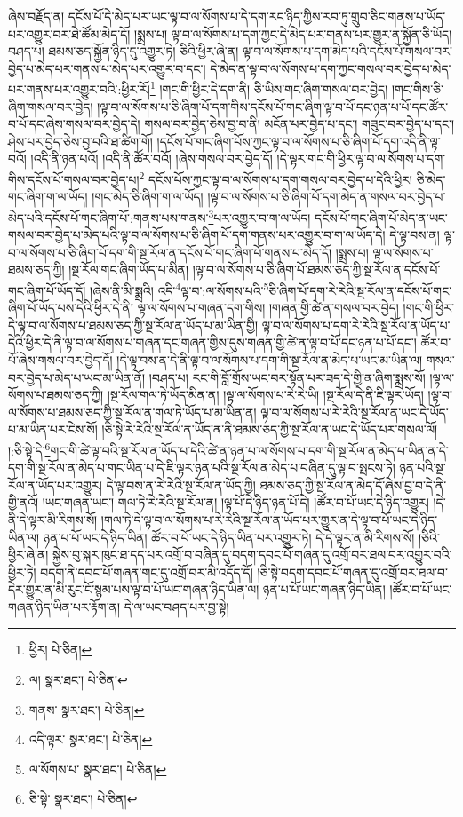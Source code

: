 ཞེས་བརྗོད་ན། དངོས་པོ་དེ་མེད་པར་ཡང་ལྟ་བ་ལ་སོགས་པ་དེ་དག་རང་ཉིད་ཀྱིས་རབ་ཏུ་གྲུབ་ཅིང་གནས་པ་ཡོད་པར་འགྱུར་བར་ཐེ་ཚོམ་མེད་དོ། །སྨྲས་པ། ལྟ་བ་ལ་སོགས་པ་དག་ཀྱང་དེ་མེད་པར་གནས་པར་གྱུར་ན་སྐྱོན་ཅི་ཡོད། བཤད་པ། ཐམས་ཅད་སྐྱོན་ཉིད་དུ་འགྱུར་ཏེ། ཅིའི་ཕྱིར་ཞེ་ན། ལྟ་བ་ལ་སོགས་པ་དག་མེད་པའི་དངོས་པོ་གསལ་བར་བྱེད་པ་མེད་པར་གནས་པ་མེད་པར་འགྱུར་བ་དང་། དེ་མེད་ན་ལྟ་བ་ལ་སོགས་པ་དག་ཀྱང་གསལ་བར་བྱེད་པ་མེད་པར་གནས་པར་འགྱུར་བའི་:ཕྱིར་རོ།\footnote{ཕྱིར།  པེ་ཅིན། } །གང་གི་ཕྱིར་དེ་དག་ནི། ཅི་ཡིས་གང་ཞིག་གསལ་བར་བྱེད། །གང་གིས་ཅི་ཞིག་གསལ་བར་བྱེད། །ལྟ་བ་ལ་སོགས་པ་ཅི་ཞིག་པོ་དག་གིས་དངོས་པོ་གང་ཞིག་ལྟ་བ་པོ་དང་ཉན་པ་པོ་དང་ཚོར་བ་པོ་དང་ཞེས་གསལ་བར་བྱེད་དེ། གསལ་བར་བྱེད་ཅེས་བྱ་བ་ནི། མངོན་པར་བྱེད་པ་དང་། གཟུང་བར་བྱེད་པ་དང་། ཤེས་པར་བྱེད་ཅེས་བྱ་བའི་ཐ་ཚིག་གོ། །དངོས་པོ་གང་ཞིག་པོས་ཀྱང་ལྟ་བ་ལ་སོགས་པ་ཅི་ཞིག་པོ་དག་འདི་ནི་ལྟ་བའོ། །འདི་ནི་ཉན་པའོ། །འདི་ནི་ཚོར་བའོ། །ཞེས་གསལ་བར་བྱེད་དོ། །དེ་ལྟར་གང་གི་ཕྱིར་ལྟ་བ་ལ་སོགས་པ་དག་གིས་དངོས་པོ་གསལ་བར་བྱེད་པ།\footnote{ལ།  སྣར་ཐང་།  པེ་ཅིན། } དངོས་པོས་ཀྱང་ལྟ་བ་ལ་སོགས་པ་དག་གསལ་བར་བྱེད་པ་དེའི་ཕྱིར། ཅི་མེད་གང་ཞིག་ག་ལ་ཡོད། །གང་མེད་ཅི་ཞིག་ག་ལ་ཡོད། །ལྟ་བ་ལ་སོགས་པ་ཅི་ཞིག་པོ་དག་མེད་ན་གསལ་བར་བྱེད་པ་མེད་པའི་དངོས་པོ་གང་ཞིག་པོ་:གནས་པས་གནས་\footnote{གནས་  སྣར་ཐང་།  པེ་ཅིན། }པར་འགྱུར་བ་ག་ལ་ཡོད། དངོས་པོ་གང་ཞིག་པོ་མེད་ན་ཡང་གསལ་བར་བྱེད་པ་མེད་པའི་ལྟ་བ་ལ་སོགས་པ་ཅི་ཞིག་པོ་དག་གནས་པར་འགྱུར་བ་ག་ལ་ཡོད་དེ། དེ་ལྟ་བས་ན། ལྟ་བ་ལ་སོགས་པ་ཅི་ཞིག་པོ་དག་གི་སྔ་རོལ་ན་དངོས་པོ་གང་ཞིག་པོ་གནས་པ་མེད་དོ། །སྨྲས་པ། ལྟ་ལ་སོགས་པ་ཐམས་ཅད་ཀྱི། །སྔ་རོལ་གང་ཞིག་ཡོད་པ་མིན། །ལྟ་བ་ལ་སོགས་པ་ཅི་ཞིག་པོ་ཐམས་ཅད་ཀྱི་སྔ་རོལ་ན་དངོས་པོ་གང་ཞིག་པོ་ཡོད་དོ། །ཞེས་ནི་མི་སྨྲའི། འདི་\footnote{འདི་ལྟར་  སྣར་ཐང་།  པེ་ཅིན། }ལྟ་བ་:ལ་སོགས་པའི་\footnote{ལ་སོགས་པ་  སྣར་ཐང་།  པེ་ཅིན། }ཅི་ཞིག་པོ་དག་རེ་རེའི་སྔ་རོལ་ན་དངོས་པོ་གང་ཞིག་པོ་ཡོད་པས་དེའི་ཕྱིར་དེ་ནི། ལྟ་ལ་སོགས་པ་གཞན་དག་གིས། །གཞན་གྱི་ཚེ་ན་གསལ་བར་བྱེད། །གང་གི་ཕྱིར་དེ་ལྟ་བ་ལ་སོགས་པ་ཐམས་ཅད་ཀྱི་སྔ་རོལ་ན་ཡོད་པ་མ་ཡིན་གྱི། ལྟ་བ་ལ་སོགས་པ་དག་རེ་རེའི་སྔ་རོལ་ན་ཡོད་པ་དེའི་ཕྱིར་དེ་ནི་ལྟ་བ་ལ་སོགས་པ་གཞན་དང་གཞན་གྱིས་དུས་གཞན་གྱི་ཚེ་ན་ལྟ་བ་པོ་དང་ཉན་པ་པོ་དང་། ཚོར་བ་པོ་ཞེས་གསལ་བར་བྱེད་དོ། །དེ་ལྟ་བས་ན་དེ་ནི་ལྟ་བ་ལ་སོགས་པ་དག་གི་སྔ་རོལ་ན་མེད་པ་ཡང་མ་ཡིན་ལ། གསལ་བར་བྱེད་པ་མེད་པ་ཡང་མ་ཡིན་ནོ། །བཤད་པ། རང་གི་བློ་གྲོས་ཡང་བར་སྟོན་པར་ཟད་དེ་གྱི་ན་ཞིག་སྨྲས་སོ། །ལྟ་ལ་སོགས་པ་ཐམས་ཅད་ཀྱི། །སྔ་རོལ་གལ་ཏེ་ཡོད་མིན་ན། །ལྟ་ལ་སོགས་པ་རེ་རེ་ཡི། །སྔ་རོལ་དེ་ནི་ཇི་ལྟར་ཡོད། །ལྟ་བ་ལ་སོགས་པ་ཐམས་ཅད་ཀྱི་སྔ་རོལ་ན་གལ་ཏེ་ཡོད་པ་མ་ཡིན་ན། ལྟ་བ་ལ་སོགས་པ་རེ་རེའི་སྔ་རོལ་ན་ཡང་དེ་ཡོད་པ་མ་ཡིན་པར་ངེས་སོ། །ཅི་སྟེ་རེ་རེའི་སྔ་རོལ་ན་ཡོད་ན་ནི་ཐམས་ཅད་ཀྱི་སྔ་རོལ་ན་ཡང་དེ་ཡོད་པར་གསལ་ལོ། །:ཅི་སྟེ་དེ་\footnote{ཅི་སྟེ་  སྣར་ཐང་།  པེ་ཅིན། }གང་གི་ཚེ་ལྟ་བའི་སྔ་རོལ་ན་ཡོད་པ་དེའི་ཚེ་ན་ཉན་པ་ལ་སོགས་པ་དག་གི་སྔ་རོལ་ན་མེད་པ་ཡིན་ན་དེ་དག་གི་སྔ་རོལ་ན་མེད་པ་གང་ཡིན་པ་དེ་ཇི་ལྟར་ཉན་པའི་སྔ་རོལ་ན་མེད་པ་བཞིན་དུ་ལྟ་བ་སྤངས་ཏེ། ཉན་པའི་སྔ་རོལ་ན་ཡོད་པར་འགྱུར། དེ་ལྟ་བས་ན་རེ་རེའི་སྔ་རོལ་ན་ཡོད་ཀྱི། ཐམས་ཅད་ཀྱི་སྔ་རོལ་ན་མེད་དོ་ཞེས་བྱ་བ་དེ་ནི་གྱི་ནའོ། །ཡང་གཞན་ཡང་། གལ་ཏེ་རེ་རེའི་སྔ་རོལ་ན། །ལྟ་པོ་དེ་ཉིད་ཉན་པོ་དེ། །ཚོར་བ་པོ་ཡང་དེ་ཉིད་འགྱུར། །དེ་ནི་དེ་ལྟར་མི་རིགས་སོ། །གལ་ཏེ་དེ་ལྟ་བ་ལ་སོགས་པ་རེ་རེའི་སྔ་རོལ་ན་ཡོད་པར་གྱུར་ན་དེ་ལྟ་བ་པོ་ཡང་དེ་ཉིད་ཡིན་ལ། ཉན་པ་པོ་ཡང་དེ་ཉིད་ཡིན། ཚོར་བ་པོ་ཡང་དེ་ཉིད་ཡིན་པར་འགྱུར་ཏེ། དེ་དེ་ལྟར་ན་མི་རིགས་སོ། །ཅིའི་ཕྱིར་ཞེ་ན། སྐྱེས་བུ་སྐར་ཁུང་ཐ་དད་པར་འགྲོ་བ་བཞིན་དུ་བདག་དབང་པོ་གཞན་དུ་འགྲོ་བར་ཐལ་བར་འགྱུར་བའི་ཕྱིར་ཏེ། བདག་ནི་དབང་པོ་གཞན་གང་དུ་འགྲོ་བར་མི་འདོད་དོ། །ཅི་སྟེ་བདག་དབང་པོ་གཞན་དུ་འགྲོ་བར་ཐལ་བ་དེར་གྱུར་ན་མི་རུང་ངོ་སྙམ་པས་ལྟ་བ་པོ་ཡང་གཞན་ཉིད་ཡིན་ལ། ཉན་པ་པོ་ཡང་གཞན་ཉིད་ཡིན། །ཚོར་བ་པོ་ཡང་གཞན་ཉིད་ཡིན་པར་རྟོག་ན། དེ་ལ་ཡང་བཤད་པར་བྱ་སྟེ། 